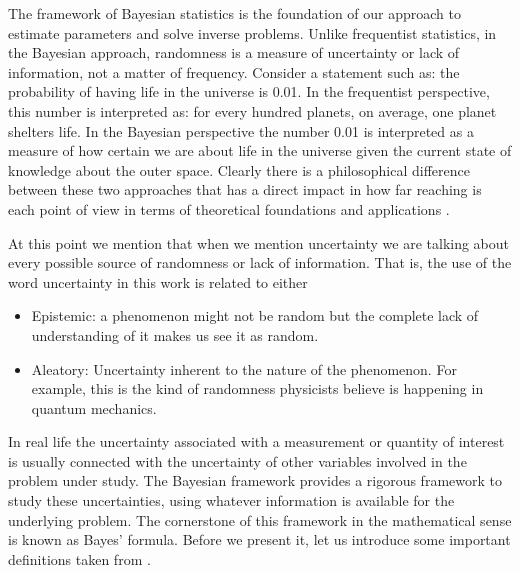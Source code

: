 \documentclass{sfuthesis}
\begin{document}
The framework of Bayesian statistics is the foundation of  our approach to estimate parameters and solve 
inverse problems. Unlike frequentist statistics, in the Bayesian approach, randomness
is a measure of uncertainty or lack of information,  not a matter of frequency. Consider a statement such  as:
the probability of having life in the universe is 0.01. In the frequentist
perspective, this number is interpreted as: for every hundred planets, on average, one planet shelters life.
 In the Bayesian
perspective the number 0.01 is interpreted as a measure of how certain we are about life in the universe
given the current state of knowledge about the outer space. 
Clearly there is a philosophical
difference between these two approaches that has a direct impact in how far reaching is each point of view 
in terms of theoretical foundations and applications  \cite{jaynes2003probability}.


At this point we mention that when we mention uncertainty we are talking about every possible 
source of randomness  or  lack of information. That is, the use of the word uncertainty in this work
is related to either \cite{kennedy2001bayesian}
\begin{itemize}
\item Epistemic: a phenomenon might not be random but the complete lack of 
understanding of it makes us see it as random.
\item Aleatory: Uncertainty inherent to the nature of the phenomenon. For 
example, this is the kind of randomness physicists believe is happening in quantum mechanics.
\end{itemize}
In real life the uncertainty associated with a  measurement or  quantity 
of interest is usually connected  with the uncertainty  of other variables involved in the problem under study. 
The Bayesian framework provides a rigorous framework to study these uncertainties, 
using whatever information is available for the underlying problem. The cornerstone of this framework
in the mathematical sense is known as   Bayes' formula. Before we present it, let us 
introduce some important definitions taken from \cite{dudley2002real}.
\end{document}
